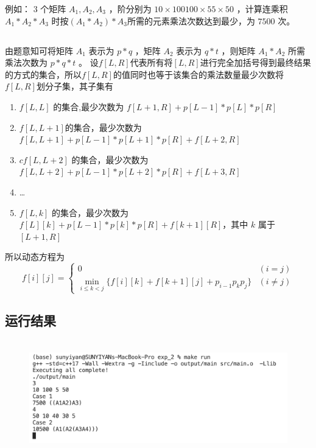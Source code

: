 例如： $3$ 个矩阵 $A_1,A_2,A_3$ ，阶分别为 $10×100 100×5 5×50$ ，计算连乘积 $A_1*A_2*A_3$ 时按$(A_1*A_2)*A_3$所需的元素乘法次数达到最少，为 $7500$ 次。


\subsection*{}
由题意知可将矩阵 $A_1$ 表示为 $p*q$ ，矩阵 $A_2$ 表示为 $q*t$ ，则矩阵 $A_1*A_2$ 所需乘法次数为 $p*q*t$ 。
设$f[L,R]$代表所有将$[L,R]$进行完全加括号得到最终结果的方式的集合，所以$f[L,R]$的值同时也等于该集合的乘法数量最少次数将$f[L,R]$划分子集，其子集有
\begin{enumerate}
    \item $f[L,L]$ 的集合,最少次数为 $f[L + 1,R]+p[L - 1] * p[L] * p[R]$
    \item  $f[L,L + 1]$的集合，最少次数为 $f[L,L + 1] + p[L - 1] * p[L + 1] * p[R] + f[L + 2,R]$
    \item $cf[L,L + 2]$ 的集合，最少次数为 $f[L,L + 2] + p[L - 1] * p[L + 2] * p[R] + f[L + 3,R]$
    \item \dots
    \item $f[L,k]$ 的集合，最少次数为 $f[L][k] + p[L - 1] * p[k] * p[R] + f[k + 1][R]$，其中 $k$ 属于 $[L + 1,R]$
\end{enumerate}
所以动态方程为
\[ f[i][j] = \left\{
\begin{array}{lr}
0 & (i=j) \\
\displaystyle\min_{i\leqslant k<j}\{f[i][k]+f[k+1][j]+p_{i-1}p_kp_j\} & (i\neq j)
\end{array} \right. \]
\newpage

\subsection*{}


\begin{code}
    
\end{code}

\subsection*{运行结果}

\begin{figure}[htbp]
    \centering
    \includegraphics[height=5cm]{figure/run_time_2.png}
  \end{figure} 

